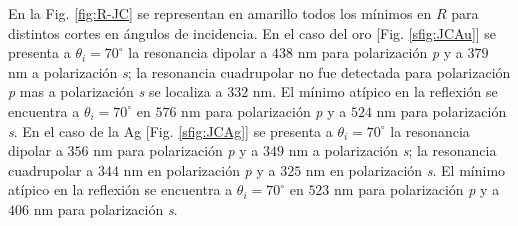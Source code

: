 \documentclass[letterpaper,11pt] {article}
\begin{document}
En la Fig.  \ref{fig:R-JC} se representan en amarillo todos los mínimos en $R$ para distintos cortes en ángulos de incidencia.  En el caso del oro [Fig.  \ref{sfig:JCAu}] se presenta a $\theta_i=70^\circ$ la resonancia dipolar  a $438$ nm para polarización \emph{p} y a $379$ nm a polarización \emph{s}; la resonancia cuadrupolar no fue detectada para polarización \emph{p} mas a polarización \emph{s}  se localiza a $332$ nm.  El mínimo atípico en la reflexión se encuentra a $\theta_i=70^\circ$ en $576$ nm para polarización \emph{p} y a $524$ nm para polarización \emph{s}.  En el caso de la Ag [Fig.  \ref{sfig:JCAg}] se presenta a $\theta_i=70^\circ$ la resonancia dipolar  a $356$ nm para polarización \emph{p} y a $349$ nm a polarización \emph{s}; la resonancia cuadrupolar a $344$ nm en polarización \emph{p} y a $325$ nm en polarización \emph{s}.  El mínimo atípico en la reflexión se encuentra a $\theta_i=70^\circ$ en $523$ nm para polarización \emph{p} y a $406$ nm para polarización \emph{s}. 
\end{document}
